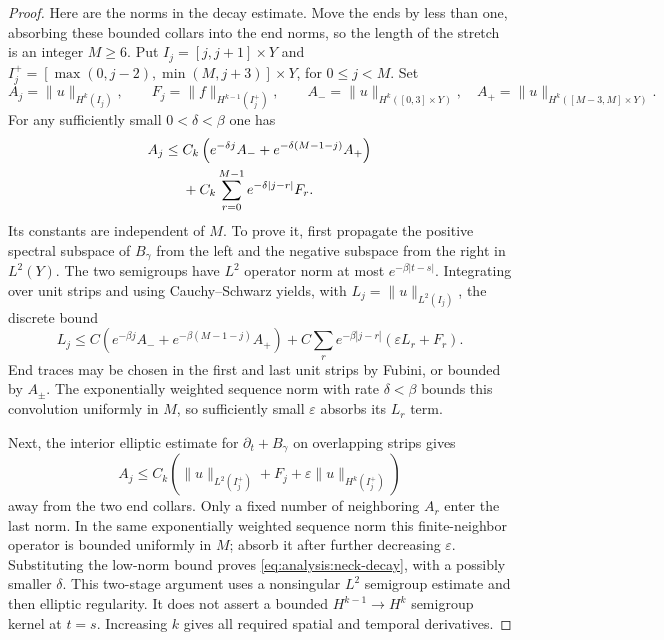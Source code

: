 \begin{proof}
Here are the norms in the decay estimate.  Move the ends by less
than one, absorbing these bounded collars into the end norms, so
the length of the stretch is an integer $M\geq6$.  Put
$I_j=[j,j+1]\times Y$ and
$I_j^+=[\max(0,j-2),\min(M,j+3)]\times Y$, for $0\leq j<M$.
Set
\[
 A_j=\|u\|_{H^k(I_j)},\qquad
 F_j=\|f\|_{H^{k-1}(I_j^+)},\qquad
 A_-=\|u\|_{H^k([0,3]\times Y)},\quad
 A_+=\|u\|_{H^k([M-3,M]\times Y)}.
\]
For any sufficiently small $0<\delta<\beta$ one has
\begin{align}\label{eq:analysis:neck-decay}
 A_j\leq{}&C_k\left(e^{-\delta j}A_-
                 +e^{-\delta(M-1-j)}A_+\right)\notag\\
          &+C_k\sum_{r=0}^{M-1}e^{-\delta|j-r|}F_r.
\end{align}
Its constants are independent of $M$.  To prove it, first propagate
the positive spectral subspace of $B_\gamma$ from the left and the
negative subspace from the right in $L^2(Y)$.  The two semigroups
have $L^2$ operator norm at most $e^{-\beta|t-s|}$.  Integrating over
unit strips and using Cauchy--Schwarz yields, with
$L_j=\|u\|_{L^2(I_j)}$, the discrete bound
\[
 L_j\leq C\left(e^{-\beta j}A_-+e^{-\beta(M-1-j)}A_+\right)
       +C\sum_r e^{-\beta|j-r|}(\varepsilon L_r+F_r).
\]
End traces may be chosen in the first and last unit strips by
Fubini, or bounded by $A_\pm$.  The exponentially weighted sequence
norm with rate $\delta<\beta$ bounds this convolution uniformly in
$M$, so sufficiently small $\varepsilon$ absorbs its $L_r$ term.

Next, the interior elliptic estimate for $\partial_t+B_\gamma$ on
overlapping strips gives
\[
 A_j\leq C_k\left(\|u\|_{L^2(I_j^+)}+F_j
                   +\varepsilon\|u\|_{H^k(I_j^+)}\right)
\]
away from the two end collars.  Only a fixed number of neighboring
$A_r$ enter the last norm.  In the same exponentially weighted
sequence norm this finite-neighbor operator is bounded uniformly in
$M$; absorb it after further decreasing $\varepsilon$.  Substituting
the low-norm bound proves \eqref{eq:analysis:neck-decay}, with a
possibly smaller $\delta$.  This two-stage argument uses a nonsingular
$L^2$ semigroup estimate and then elliptic regularity.  It does not
assert a bounded $H^{k-1}\to H^k$ semigroup kernel at $t=s$.
Increasing $k$ gives all required spatial and temporal derivatives.


\end{proof}
